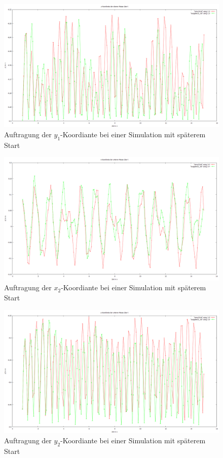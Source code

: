 \begin{figure}
        \includegraphics[width=.9\textwidth]{images/y1_ueber_t.png}
\caption{Auftragung der $y_1$-Koordiante bei einer Simulation mit späterem Start}
\label{y1_ueber_t}
\end{figure}

\begin{figure}
        \includegraphics[width=.9\textwidth]{images/x2_ueber_t.png}
\caption{Auftragung der $x_2$-Koordiante bei einer Simulation mit späterem Start}
\label{x2_ueber_t}
\end{figure}

\begin{figure}
        \includegraphics[width=.9\textwidth]{images/y2_ueber_t.png}
\caption{Auftragung der $y_2$-Koordiante bei einer Simulation mit späterem Start}
\label{y2_ueber_t}
\end{figure}

